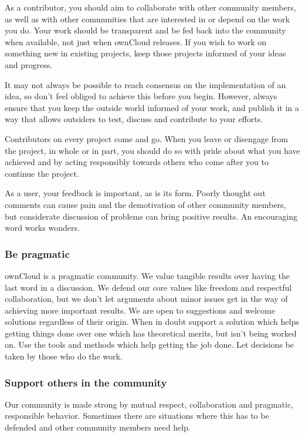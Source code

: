 \documentclass[letterpaper,10pt,english]{sphinxmanual}
\begin{document}
As a contributor, you should aim to collaborate with other community members, as well as with other communities that are interested in or depend on the work you do. Your work should be transparent and be fed back into the community when available, not just when ownCloud releases. If you wish to work on something new in existing projects, keep those projects informed of your ideas and progress.

It may not always be possible to reach consensus on the implementation of an idea, so don’t feel obliged to achieve this before you begin. However, always ensure that you keep the outside world informed of your work, and publish it in a way that allows outsiders to test, discuss and contribute to your efforts.

Contributors on every project come and go. When you leave or disengage from the project, in whole or in part, you should do so with pride about what you have achieved and by acting responsibly towards others who come after you to continue the project.

As a user, your feedback is important, as is its form. Poorly thought out comments can cause pain and the demotivation of other community members, but considerate discussion of problems can bring positive results. An encouraging word works wonders.


\subsubsection{Be pragmatic}
\label{general/code-of-conduct:be-pragmatic}
ownCloud is a pragmatic community. We value tangible results over having the last word in a discussion. We defend our core values like freedom and respectful collaboration, but we don’t let arguments about minor issues get in the way of achieving more important results. We are open to suggestions and welcome solutions regardless of their origin. When in doubt support a solution which helps getting things done over one which has theoretical merits, but isn’t being worked on. Use the tools and methods which help getting the job done. Let decisions be taken by those who do the work.


\subsubsection{Support others in the community}
\label{general/code-of-conduct:support-others-in-the-community}
Our community is made strong by mutual respect, collaboration and pragmatic, responsible behavior. Sometimes there are situations where this has to be defended and other community members need help.
\end{document}
